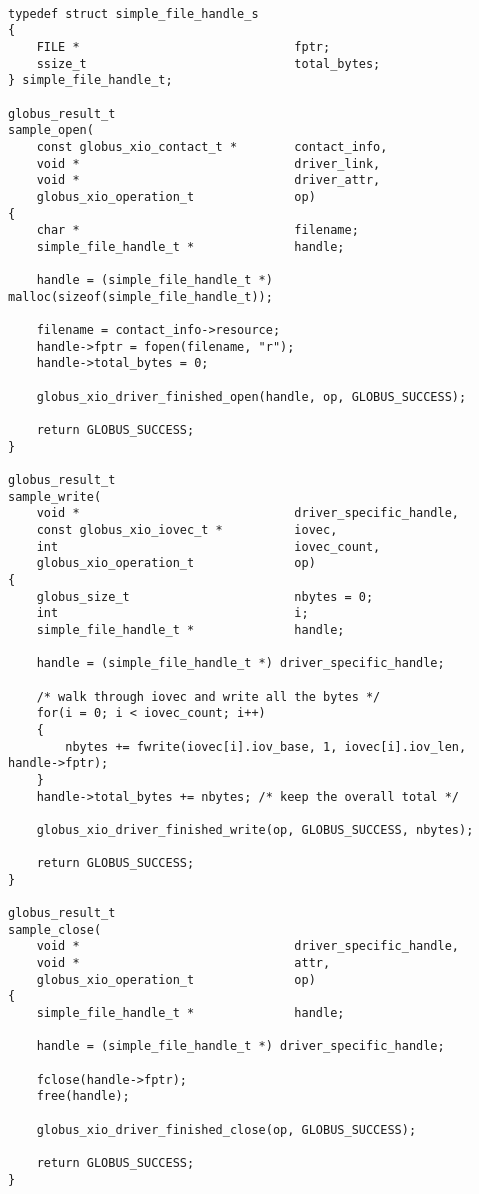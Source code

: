\documentclass[11pt]{article}
\begin{document}
\begin{verbatim}

typedef struct simple_file_handle_s
{
    FILE *                              fptr;
    ssize_t                             total_bytes;
} simple_file_handle_t;

globus_result_t
sample_open(
    const globus_xio_contact_t *        contact_info,
    void *                              driver_link,
    void *                              driver_attr,
    globus_xio_operation_t              op)
{
    char *                              filename;
    simple_file_handle_t *              handle;

    handle = (simple_file_handle_t *) malloc(sizeof(simple_file_handle_t));

    filename = contact_info->resource;
    handle->fptr = fopen(filename, "r");
    handle->total_bytes = 0;
                   
    globus_xio_driver_finished_open(handle, op, GLOBUS_SUCCESS);

    return GLOBUS_SUCCESS;
}

globus_result_t
sample_write(
    void *                              driver_specific_handle,
    const globus_xio_iovec_t *          iovec,
    int                                 iovec_count,
    globus_xio_operation_t              op)
{
    globus_size_t                       nbytes = 0;
    int                                 i;
    simple_file_handle_t *              handle;

    handle = (simple_file_handle_t *) driver_specific_handle;

    /* walk through iovec and write all the bytes */
    for(i = 0; i < iovec_count; i++)
    {
        nbytes += fwrite(iovec[i].iov_base, 1, iovec[i].iov_len, handle->fptr);
    }
    handle->total_bytes += nbytes; /* keep the overall total */

    globus_xio_driver_finished_write(op, GLOBUS_SUCCESS, nbytes);

    return GLOBUS_SUCCESS;
}

globus_result_t
sample_close(
    void *                              driver_specific_handle,
    void *                              attr,
    globus_xio_operation_t              op)
{
    simple_file_handle_t *              handle;

    handle = (simple_file_handle_t *) driver_specific_handle;

    fclose(handle->fptr);
    free(handle);

    globus_xio_driver_finished_close(op, GLOBUS_SUCCESS);

    return GLOBUS_SUCCESS;
}


\end{verbatim}
\end{document}
